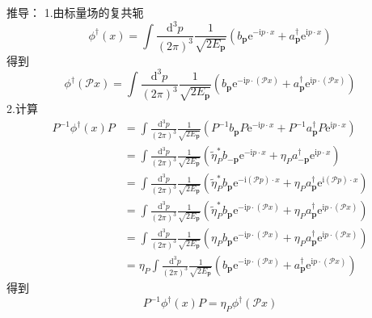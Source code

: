 推导：
1.由标量场的复共轭
\begin{equation}
    \phi ^{\dagger}(x)=\int{\frac{\mathrm{d}^3p}{\left( 2\pi \right) ^3}}\frac{1}{\sqrt{2E_{\mathbf{p}}}}\left( b_{\mathbf{p}}\mathrm{e}^{-\mathrm{i}p\cdot x}+a_{\mathbf{p}}^{\dagger}\mathrm{e}^{\mathrm{i}p\cdot x} \right) 
\end{equation}
得到
\begin{equation}
    \phi ^{\dagger}(\mathcal{P} x)=\int{\frac{\mathrm{d}^3p}{\left( 2\pi \right) ^3}}\frac{1}{\sqrt{2E_{\mathbf{p}}}}\left( b_{\mathbf{p}}\mathrm{e}^{-\mathrm{i}p\cdot \left( \mathcal{P} x \right)}+a_{\mathbf{p}}^{\dagger}\mathrm{e}^{\mathrm{i}p\cdot \left( \mathcal{P} x \right)} \right) 
\end{equation}
2.计算
\begin{equation}
    \begin{aligned}
        P^{-1}\phi ^{\dagger}(x)P&=\int{\frac{\mathrm{d}^3p}{\left( 2\pi \right) ^3}}\frac{1}{\sqrt{2E_{\mathbf{p}}}}\left( P^{-1}b_{\mathbf{p}}P\mathrm{e}^{-\mathrm{i}p\cdot x}+P^{-1}a_{\mathbf{p}}^{\dagger}P\mathrm{e}^{\mathrm{i}p\cdot x} \right) 
\\
&=\int{\frac{\mathrm{d}^3p}{\left( 2\pi \right) ^3}}\frac{1}{\sqrt{2E_{\mathbf{p}}}}\left( \tilde{\eta}_{P}^{*}b_{-\mathbf{p}}\mathrm{e}^{-\mathrm{i}p\cdot x}+\eta _Pa_{-\mathbf{p}}^{\dagger}\mathrm{e}^{\mathrm{i}p\cdot x} \right) 
\\
&=\int{\frac{\mathrm{d}^3p}{\left( 2\pi \right) ^3}}\frac{1}{\sqrt{2E_{\mathbf{p}}}}\left( \tilde{\eta}_{P}^{*}b_{\mathbf{p}}\mathrm{e}^{-\mathrm{i}\left( \mathcal{P} p \right) \cdot x}+\eta _Pa_{\mathbf{p}}^{\dagger}\mathrm{e}^{\mathrm{i}\left( \mathcal{P} p \right) \cdot x} \right) 
\\
&=\int{\frac{\mathrm{d}^3p}{\left( 2\pi \right) ^3}}\frac{1}{\sqrt{2E_{\mathbf{p}}}}\left( \tilde{\eta}_{P}^{*}b_{\mathbf{p}}\mathrm{e}^{-\mathrm{i}p\cdot \left( \mathcal{P} x \right)}+\eta _Pa_{\mathbf{p}}^{\dagger}\mathrm{e}^{\mathrm{i}p\cdot \left( \mathcal{P} x \right)} \right) 
\\
&=\int{\frac{\mathrm{d}^3p}{\left( 2\pi \right) ^3}}\frac{1}{\sqrt{2E_{\mathbf{p}}}}\left( \eta _Pb_{\mathbf{p}}\mathrm{e}^{-\mathrm{i}p\cdot \left( \mathcal{P} x \right)}+\eta _Pa_{\mathbf{p}}^{\dagger}\mathrm{e}^{\mathrm{i}p\cdot \left( \mathcal{P} x \right)} \right) 
\\
&=\eta _P\int{\frac{\mathrm{d}^3p}{\left( 2\pi \right) ^3}}\frac{1}{\sqrt{2E_{\mathbf{p}}}}\left( b_{\mathbf{p}}\mathrm{e}^{-\mathrm{i}p\cdot \left( \mathcal{P} x \right)}+a_{\mathbf{p}}^{\dagger}\mathrm{e}^{\mathrm{i}p\cdot \left( \mathcal{P} x \right)} \right) 
    \end{aligned}
\end{equation}
得到
\begin{equation}
    P^{-1}\phi ^{\dagger}(x)P=\eta _P\phi ^{\dagger}(\mathcal{P} x)
\end{equation}



